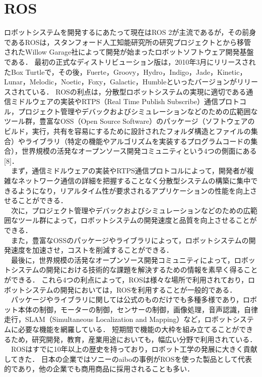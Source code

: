 \section{ROS}
ロボットシステムを開発するにあたって現在はROS 2が主流であるが，その前身であるROSは，スタンフォード人工知能研究所の研究プロジェクトとから移管されたWillow Garage社によって開発が始まったロボットソフトウェア開発基盤である．
最初の正式なディストリビューション版は，2010年3月にリリースされたBox Turtleで，その後，Fuerte，Groovy，Hydro，Indigo，Jade，Kinetic，Lunar，Melodic，Noetic，Foxy，Galactic，Humbleといったバージョンがリリースされている．
ROSの利点は，分散型ロボットシステムの実現に適切である通信ミドルウェアの実装やRTPS（Real Time Publish Subscribe）通信プロトコル，プロジェクト管理やデバックおよびシミュレーションなどのための広範囲なツール群，豊富なOSS（Open Source Software）のパッケージ（ソフトウェアのビルド，実行，共有を容易にするために設計されたフォルダ構造とファイルの集合）やライブラリ（特定の機能やアルゴリズムを実装するプログラムコードの集合），世界規模の活発なオープンソース開発コミュニティという4つの側面にある[8]．\\
　まず，通信ミドルウェアの実装やRTPS通信プロトコルによって，開発者が複雑なネットワーク通信の詳細を把握することなく分散型システムの構築に集中できるようになり，リアルタイム性が要求されるアプリケーションの性能を向上させることができる．
\\　次に，プロジェクト管理やデバックおよびシミュレーションなどのための広範囲なツール群によって，ロボットシステムの開発速度と品質を向上させることができる．
\\　また，豊富なOSSのパッケージやライブラリによって，ロボットシステムの開発速度を加速させ，コストを削減することができる．
\\　最後に，世界規模の活発なオープンソース開発コミュニティによって，ロボットシステムの開発における技術的な課題を解決するための情報を素早く得ることができる．
これら4つの利点によって，ROSは様々な場所で利用されており，ロボットシステムの開発においては，ROSを利用することが一般的である．
\\　パッケージやライブラリに関しては公式のものだけでも多種多様であり，ロボット本体の制御，モーターの制御，センサーの制御，画像処理，音声認識，自律走行，SLAM（Simultaneous Localization and Mapping）など，ロボットシステムに必要な機能を網羅している．
短期間で機能の大枠を組み立てることができるため，研究開発，教育，産業用途においても，幅広い分野で利用されている．\\
　ROSはすでに10年以上の歴史を持っており，ロボット工学の発展に大きく貢献してきた．
日本の企業ではソニーのaiboの事例がROSを使った製品として代表的であり，他の企業でも商用商品に採用されることも多い．
